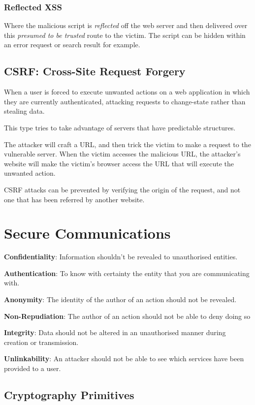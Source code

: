 \documentclass{article}
\begin{document}
\subsubsection{Reflected XSS}

Where the malicious script is \textit{reflected} off the web server and then delivered over this \textit{presumed to be trusted} route to the victim. The script can be hidden within an error request or search result for example.

\filbreak
\subsection{CSRF: Cross-Site Request Forgery}

When a user is forced to execute unwanted actions on a web application in which they are currently authenticated, attacking requests to change-state rather than stealing data.

This type tries to take advantage of servers that have predictable structures.

The attacker will craft a URL, and then trick the victim to make a request to the vulnerable server. When the victim accesses the malicious URL, the attacker's website will make the victim's browser access the URL that will execute the unwanted action.

CSRF attacks can be prevented by verifying the origin of the request, and not one that has been referred by another website.

\section{Secure Communications}

\textbf{Confidentiality}: Information shouldn't be revealed to unauthorised entities.

\textbf{Authentication}: To know with certainty the entity that you are communicating with.

\textbf{Anonymity}: The identity of the author of an action should not be revealed.

\textbf{Non-Repudiation}: The author of an action should not be able to deny doing so

\textbf{Integrity}: Data should not be altered in an unauthorised manner during creation or transmission.

\textbf{Unlinkability}: An attacker should not be able to see which services have been provided to a user.

\subsection{Cryptography Primitives}
\end{document}
